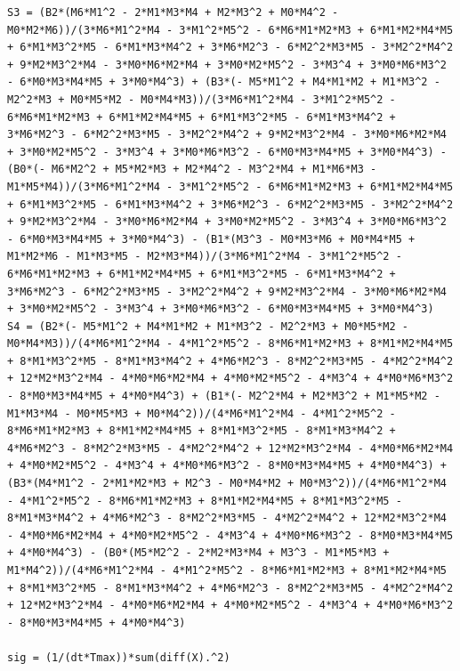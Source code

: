 \documentclass[11pt]{article} %
\begin{document}
\begin{verbatim}
S3 = (B2*(M6*M1^2 - 2*M1*M3*M4 + M2*M3^2 + M0*M4^2 - M0*M2*M6))/(3*M6*M1^2*M4 - 3*M1^2*M5^2 - 6*M6*M1*M2*M3 + 6*M1*M2*M4*M5 + 6*M1*M3^2*M5 - 6*M1*M3*M4^2 + 3*M6*M2^3 - 6*M2^2*M3*M5 - 3*M2^2*M4^2 + 9*M2*M3^2*M4 - 3*M0*M6*M2*M4 + 3*M0*M2*M5^2 - 3*M3^4 + 3*M0*M6*M3^2 - 6*M0*M3*M4*M5 + 3*M0*M4^3) + (B3*(- M5*M1^2 + M4*M1*M2 + M1*M3^2 - M2^2*M3 + M0*M5*M2 - M0*M4*M3))/(3*M6*M1^2*M4 - 3*M1^2*M5^2 - 6*M6*M1*M2*M3 + 6*M1*M2*M4*M5 + 6*M1*M3^2*M5 - 6*M1*M3*M4^2 + 3*M6*M2^3 - 6*M2^2*M3*M5 - 3*M2^2*M4^2 + 9*M2*M3^2*M4 - 3*M0*M6*M2*M4 + 3*M0*M2*M5^2 - 3*M3^4 + 3*M0*M6*M3^2 - 6*M0*M3*M4*M5 + 3*M0*M4^3) - (B0*(- M6*M2^2 + M5*M2*M3 + M2*M4^2 - M3^2*M4 + M1*M6*M3 - M1*M5*M4))/(3*M6*M1^2*M4 - 3*M1^2*M5^2 - 6*M6*M1*M2*M3 + 6*M1*M2*M4*M5 + 6*M1*M3^2*M5 - 6*M1*M3*M4^2 + 3*M6*M2^3 - 6*M2^2*M3*M5 - 3*M2^2*M4^2 + 9*M2*M3^2*M4 - 3*M0*M6*M2*M4 + 3*M0*M2*M5^2 - 3*M3^4 + 3*M0*M6*M3^2 - 6*M0*M3*M4*M5 + 3*M0*M4^3) - (B1*(M3^3 - M0*M3*M6 + M0*M4*M5 + M1*M2*M6 - M1*M3*M5 - M2*M3*M4))/(3*M6*M1^2*M4 - 3*M1^2*M5^2 - 6*M6*M1*M2*M3 + 6*M1*M2*M4*M5 + 6*M1*M3^2*M5 - 6*M1*M3*M4^2 + 3*M6*M2^3 - 6*M2^2*M3*M5 - 3*M2^2*M4^2 + 9*M2*M3^2*M4 - 3*M0*M6*M2*M4 + 3*M0*M2*M5^2 - 3*M3^4 + 3*M0*M6*M3^2 - 6*M0*M3*M4*M5 + 3*M0*M4^3)
S4 = (B2*(- M5*M1^2 + M4*M1*M2 + M1*M3^2 - M2^2*M3 + M0*M5*M2 - M0*M4*M3))/(4*M6*M1^2*M4 - 4*M1^2*M5^2 - 8*M6*M1*M2*M3 + 8*M1*M2*M4*M5 + 8*M1*M3^2*M5 - 8*M1*M3*M4^2 + 4*M6*M2^3 - 8*M2^2*M3*M5 - 4*M2^2*M4^2 + 12*M2*M3^2*M4 - 4*M0*M6*M2*M4 + 4*M0*M2*M5^2 - 4*M3^4 + 4*M0*M6*M3^2 - 8*M0*M3*M4*M5 + 4*M0*M4^3) + (B1*(- M2^2*M4 + M2*M3^2 + M1*M5*M2 - M1*M3*M4 - M0*M5*M3 + M0*M4^2))/(4*M6*M1^2*M4 - 4*M1^2*M5^2 - 8*M6*M1*M2*M3 + 8*M1*M2*M4*M5 + 8*M1*M3^2*M5 - 8*M1*M3*M4^2 + 4*M6*M2^3 - 8*M2^2*M3*M5 - 4*M2^2*M4^2 + 12*M2*M3^2*M4 - 4*M0*M6*M2*M4 + 4*M0*M2*M5^2 - 4*M3^4 + 4*M0*M6*M3^2 - 8*M0*M3*M4*M5 + 4*M0*M4^3) + (B3*(M4*M1^2 - 2*M1*M2*M3 + M2^3 - M0*M4*M2 + M0*M3^2))/(4*M6*M1^2*M4 - 4*M1^2*M5^2 - 8*M6*M1*M2*M3 + 8*M1*M2*M4*M5 + 8*M1*M3^2*M5 - 8*M1*M3*M4^2 + 4*M6*M2^3 - 8*M2^2*M3*M5 - 4*M2^2*M4^2 + 12*M2*M3^2*M4 - 4*M0*M6*M2*M4 + 4*M0*M2*M5^2 - 4*M3^4 + 4*M0*M6*M3^2 - 8*M0*M3*M4*M5 + 4*M0*M4^3) - (B0*(M5*M2^2 - 2*M2*M3*M4 + M3^3 - M1*M5*M3 + M1*M4^2))/(4*M6*M1^2*M4 - 4*M1^2*M5^2 - 8*M6*M1*M2*M3 + 8*M1*M2*M4*M5 + 8*M1*M3^2*M5 - 8*M1*M3*M4^2 + 4*M6*M2^3 - 8*M2^2*M3*M5 - 4*M2^2*M4^2 + 12*M2*M3^2*M4 - 4*M0*M6*M2*M4 + 4*M0*M2*M5^2 - 4*M3^4 + 4*M0*M6*M3^2 - 8*M0*M3*M4*M5 + 4*M0*M4^3)

sig = (1/(dt*Tmax))*sum(diff(X).^2)
\end{verbatim}
\end{document}
